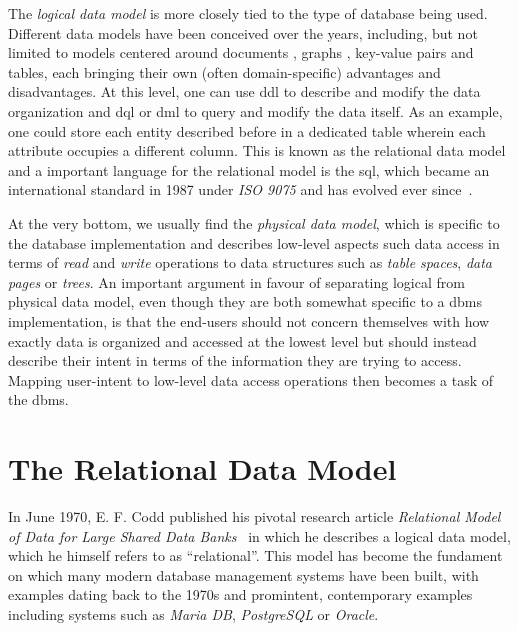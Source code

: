 The \emph{logical data model} is more closely tied to the type of database being used. Different data models have been conceived over the years, including, but not limited to models centered around documents \cite{Hashem:2016Evaluating}, graphs \cite{Angles:2008Survey}, key-value pairs and tables, each bringing their own (often domain-specific) advantages and disadvantages. At this level, one can use \acrshort{ddl} to describe and modify the data organization and \acrshort{dql} or \acrshort{dml} to query and modify the data itself. As an example, one could store each entity described before in a dedicated table wherein each attribute occupies a different column. This is known as the relational data model \cite{Codd:1970Relational} and a important language for the relational model is the \acrfull{sql}, which became an international standard in 1987 under \emph{ISO 9075} and has evolved ever since~\cite{Chamberlin:2012Early}.

At the very bottom, we usually find the \emph{physical data model}, which is specific to the database implementation and describes low-level aspects such data access in terms of \emph{read} and \emph{write} operations to data structures such as \emph{table spaces}, \emph{data pages} or \emph{trees}. An important argument in favour of separating logical from physical data model, even though they are both somewhat specific to a \acrshort{dbms} implementation, is that the end-users should not concern themselves with how exactly data is organized and accessed at the lowest level but should instead describe their intent in terms of the information they are trying to access. Mapping user-intent to low-level data access operations then becomes a task of the \acrshort{dbms}.

\section{The Relational Data Model}
\label{section:relational_data_model}

In June 1970, E. F. Codd published his pivotal research article \emph{Relational Model of Data for Large Shared Data Banks}~\cite{Codd:1970Relational} in which he describes a logical data model, which he himself refers to as ``relational''. This model has become the fundament on which many modern database management systems have been built, with examples dating back to the 1970s \cite{Astrahan:1976Systemr} and promintent, contemporary examples including systems such as \emph{Maria DB}, \emph{PostgreSQL} or \emph{Oracle}. 

